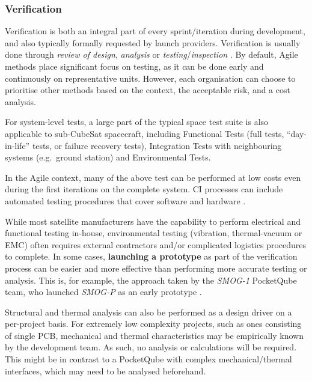\documentclass[journal,10pt]{IEEEtran}
\begin{document}
\subsubsection{Verification}
\label{sec:methodology_verification}

Verification is both an integral part of every sprint/iteration during development, and also typically formally requested by launch providers.
Verification is usually done through \emph{review of design}, \emph{analysis} or \emph{testing}/\emph{inspection} \autocite{ECSS-E-ST-10C}. By default, Agile methods place significant focus on testing, as it can be done early and continuously on representative units. However, each organisation can choose to prioritise other methods based on the context, the acceptable risk, and a cost analysis.


For system-level tests, a large part of the typical space test suite \autocite{ECSS-E-ST-10-03C}  is also applicable to sub-CubeSat spacecraft, including Functional Tests (full tests, ``day-in-life'' tests, or failure recovery tests), Integration Tests with neighbouring systems (e.g.~ground station) and Environmental Tests.

In the Agile context, many of the above test can be performed at low costs even during the first iterations on the complete system. \acf{CI} processes can include automated testing procedures that cover software and hardware \autocite{carsonCanSystemsEngineering2013}.

While most satellite manufacturers have the capability to perform electrical and functional testing in-house, environmental testing (vibration, thermal-vacuum or \acs{EMC}) often requires external contractors and/or complicated logistics procedures to complete. In some cases, \textbf{launching a prototype} as part of the verification process can be easier and more effective than performing more accurate testing or analysis. This is, for example, the approach taken by the \emph{SMOG-1} PocketQube team, who launched \emph{SMOG-P} as an early prototype \autocite{SMOG14thHungarian2021}.

Structural and thermal analysis can also be performed as a design driver on a per-project basis. For extremely low complexity projects, such as ones consisting of single \acs{PCB}, mechanical and thermal characteristics may be empirically known by the development team. As such, no analysis or calculations will be required. This might be in contrast to a PocketQube with complex mechanical/thermal interfaces, which may need to be analysed beforehand.
	
\end{document}
